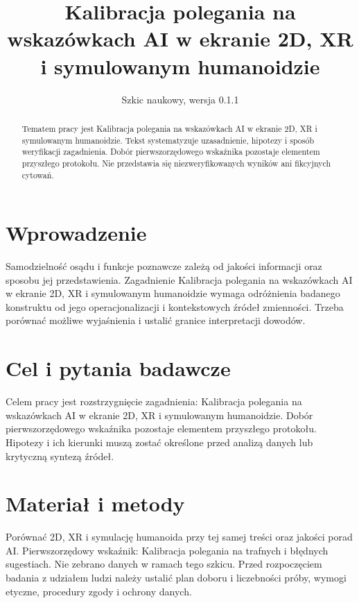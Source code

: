 \documentclass[11pt,a4paper]{article}
\title{Kalibracja polegania na wskazówkach AI w ekranie 2D, XR i symulowanym humanoidzie}
\author{}
\date{Szkic naukowy, wersja 0.1.1}
\begin{document}
\maketitle

\begin{abstract}

Tematem pracy jest Kalibracja polegania na wskazówkach AI w ekranie 2D, XR i symulowanym humanoidzie. Tekst systematyzuje uzasadnienie, hipotezy i sposób weryfikacji zagadnienia. Dobór pierwszorzędowego wskaźnika pozostaje elementem przyszłego protokołu. Nie przedstawia się niezweryfikowanych wyników ani fikcyjnych cytowań.

\end{abstract}

\section{Wprowadzenie}

Samodzielność osądu i funkcje poznawcze zależą od jakości informacji oraz sposobu jej przedstawienia. Zagadnienie Kalibracja polegania na wskazówkach AI w ekranie 2D, XR i symulowanym humanoidzie wymaga odróżnienia badanego konstruktu od jego operacjonalizacji i kontekstowych źródeł zmienności. Trzeba porównać możliwe wyjaśnienia i ustalić granice interpretacji dowodów.

\section{Cel i pytania badawcze}

Celem pracy jest rozstrzygnięcie zagadnienia: Kalibracja polegania na wskazówkach AI w ekranie 2D, XR i symulowanym humanoidzie. Dobór pierwszorzędowego wskaźnika pozostaje elementem przyszłego protokołu. Hipotezy i ich kierunki muszą zostać określone przed analizą danych lub krytyczną syntezą źródeł.

\section{Materiał i metody}

Porównać 2D, XR i symulację humanoida przy tej samej treści oraz jakości porad AI. Pierwszorzędowy wskaźnik: Kalibracja polegania na trafnych i błędnych sugestiach. Nie zebrano danych w ramach tego szkicu. Przed rozpoczęciem badania z udziałem ludzi należy ustalić plan doboru i liczebności próby, wymogi etyczne, procedury zgody i ochrony danych.
\end{document}
